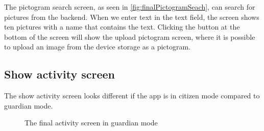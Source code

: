 The pictogram search screen, as seen in \autoref{fig:finalPictogramSeach},  can search for pictures from the backend. When we enter text in the text field, the screen shows ten pictures with a name that contains the text. Clicking the button at the bottom of the screen will show the upload pictogram screen, where it is possible to upload an image from the device storage as a pictogram.

\subsection{Show activity screen}

The show activity screen looks different if the app is in \gls{citizen} mode compared to \gls{guardian} mode.

\begin{figure}%
    \centering
    \quad
    \caption{The final activity screen in \gls{guardian} mode}%
    \label{fig:finalShowActivityGuardianModeFisk}%
\end{figure}

